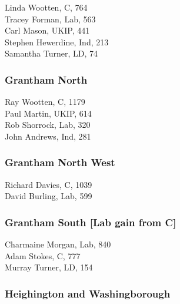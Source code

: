 \documentclass[a4paper,openany,10pt]{book}
\begin{document}
Linda Wootten, C, 764\\
Tracey Forman, Lab, 563\\
Carl Mason, UKIP, 441\\
Stephen Hewerdine, Ind, 213\\
Samantha Turner, LD, 74\\


\subsubsection*{Grantham North}



Ray Wootten, C, 1179\\
Paul Martin, UKIP, 614\\
Rob Shorrock, Lab, 320\\
John Andrews, Ind, 281\\


\subsubsection*{Grantham North West}



Richard Davies, C, 1039\\
David Burling, Lab, 599\\


\subsubsection*{Grantham South \hspace*{\fill}\nolinebreak[1]%
\enspace\hspace*{\fill}
[Lab gain from C]}



Charmaine Morgan, Lab, 840\\
Adam Stokes, C, 777\\
Murray Turner, LD, 154\\


\subsubsection*{Heighington and Washingborough}

\end{document}
